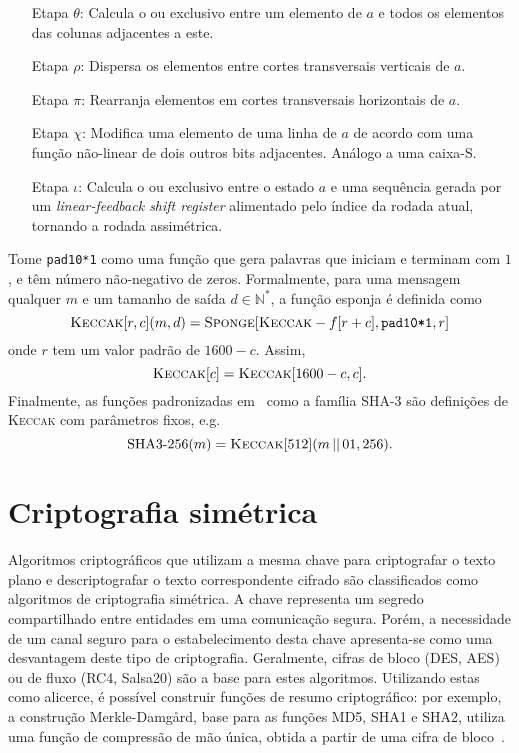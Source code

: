 \documentclass[12pt]{report}
\newcommand{\concat}{\, \vert \vert \,}
\begin{document}
\begin{enumerate}

  \item[Etapa $\theta$:] Calcula o ou exclusivo entre um elemento de $a$ e
    todos os elementos das colunas adjacentes a este.

  \item[Etapa $\rho$:] Dispersa os elementos entre cortes transversais
    verticais de $a$.

  \item[Etapa $\pi$:] Rearranja elementos em cortes transversais horizontais de
    $a$.

  \item[Etapa $\chi$:] Modifica uma elemento de uma linha de $a$ de acordo com
    uma função não-linear de dois outros bits adjacentes. Análogo a uma caixa-S.

  \item[Etapa $\iota$:] Calcula o ou exclusivo entre o estado $a$ e uma
    sequência gerada por um \emph{linear-feedback shift register} alimentado
    pelo índice da rodada atual, tornando a rodada assimétrica.

\end{enumerate}

Tome \texttt{pad10*1} como uma função que gera palavras que iniciam e terminam
com $1$, e têm número não-negativo de zeros. Formalmente, para uma mensagem
qualquer $m$ e um tamanho de saída $d \in \mathbb{N}^{*}$, a função esponja é
definida como
\begin{equation}
  \textsc{Keccak}[r, c](m, d)
    = \textsc{Sponge}[\textsc{Keccak}-f[r + c], \texttt{pad10*1}, r]
\end{equation}
onde $r$ tem um valor padrão de $1600 - c$. Assim,
\begin{equation}
  \textsc{Keccak}[c] = \textsc{Keccak}[1600 - c, c].
\end{equation}
Finalmente, as funções padronizadas em~\cite{Dworkin2015} como a família SHA-3
são definições de \textsc{Keccak} com parâmetros fixos, e.g.
\begin{equation}
  \text{SHA3-}256(m) = \textsc{Keccak}[512](m \concat 01, 256).
\end{equation}

\section{Criptografia simétrica}

Algoritmos criptográficos que utilizam a mesma chave para criptografar o
texto plano e descriptografar o texto correspondente cifrado são classificados
como algoritmos de criptografia simétrica. A chave representa um segredo
compartilhado entre entidades em uma comunicação segura. Porém, a necessidade
de um canal seguro para o estabelecimento desta chave apresenta-se como uma
desvantagem deste tipo de criptografia. Geralmente, cifras de bloco (DES, AES)
ou de fluxo (RC4, Salsa20) são a base para estes algoritmos. Utilizando estas
como alicerce, é possível construir funções de resumo criptográfico: por
exemplo, a construção Merkle-Damgård, base para as funções MD5, SHA1 e SHA2,
utiliza uma função de compressão de mão única, obtida a partir de uma cifra de
bloco~\cite[9.41]{Menezes:1996:HAC:548089}.
\end{document}
